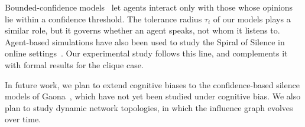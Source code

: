 Bounded-confidence models~\cite{Deffuant2000} let agents interact only
with those whose opinions lie within a confidence threshold. The
tolerance radius $\tau_i$ of our models plays a similar role, but it
governs whether an agent speaks, not whom it listens to. Agent-based
simulations have also been used to study the Spiral of Silence in
online settings~\cite{Sohn2022,Wang2013,Ross2019,Cabrera2021}. Our
experimental study follows this line, and complements it with formal
results for the clique case.

In future work, we plan to extend cognitive biases to the confidence-based
silence models of Gaona~\cite{gaona2024opinion}, which have not yet been
studied under cognitive bias. We also plan to study dynamic network
topologies, in which the influence graph evolves over time.
